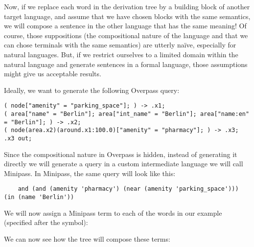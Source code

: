 \documentclass[main.tex]{subfiles}
\begin{document}
Now, if we replace each word in the derivation tree by a building block of another
target language, and assume that we have chosen blocks with the same semantics,
we will compose a sentence in the other language that has the same meaning!
Of course, those suppositions (the compositional nature of the language and
that we can chose terminals with the same semantics) are utterly naïve,
especially for natural languages. But, if we restrict ourselves to a limited
domain within the natural language and generate sentences in a formal language,
those assumptions might give us acceptable results.

Ideally, we want to generate the following Overpass query:
\begin{lstwrap}\begin{lstlisting}
( node["amenity" = "parking_space"]; ) -> .x1;
( area["name" = "Berlin"]; area["int_name" = "Berlin"]; area["name:en" = "Berlin"]; ) -> .x2;
( node(area.x2)(around.x1:100.0)["amenity" = "pharmacy"]; ) -> .x3;
.x3 out;
\end{lstlisting}\end{lstwrap}

Since the compositional nature in Overpass is hidden, instead of generating
it directly we will generate a query in a custom intermediate language we will
call Minipass. In Minipass, the same query will look like this:
\begin{lstwrap}\begin{lstlisting}
    and (and (amenity 'pharmacy') (near (amenity 'parking_space'))) (in (name 'Berlin'))
\end{lstlisting}\end{lstwrap}

We will now assign a Minipass term to each of the words in our example (specified
after the  symbol):

We can now see how the tree will compose these terms:
\end{document}
